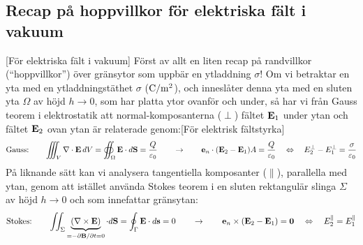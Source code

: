{{{{{\subsection{Recap p{\aa} hoppvillkor f{\"o}r elektriska f{\"a}lt i vakuum}
[F{\"o}r elektriska f{\"a}lt i vakuum]
F{\"o}rst av allt en liten recap p{\aa} randvillkor (``hoppvillkor'') {\"o}ver
gr{\"a}nsytor som uppb{\"a}r en ytladdning $\sigma$!
\noindent
Om vi betraktar en yta med en ytladdningst{\"a}thet
$\sigma$ (${\rm C}/{\rm m}^2$), och innesl{\aa}ter denna yta med en sluten
yta
$\Omega$ av h{\"o}jd $h\to0$, som har platta ytor ovanf{\"o}r och under,
s{\aa} har vi fr{\aa}n Gauss teorem i elektrostatik att normal-komposanterna
($\perp$) f{\"a}ltet ${\bf E}_1$ under ytan och f{\"a}ltet ${\bf E}_2$ ovan
ytan {\"a}r relaterade genom:[F{\"o}r elektrisk f{\"a}ltstyrka]
$$
  \hbox{Gauss:}\qquad
  \displaystyle
  \iiint_V\nabla\cdot{\bf E}\,dV=
  \oiint_{\Omega}{\bf E}\cdot d{\bf S}={{Q}\over{\varepsilon_0}}
  \qquad\to\qquad
  {\bf e}_n \cdot({\bf E}_{2}-{\bf E}_{1})A
    ={{Q}\over{\varepsilon_0}}
  \quad\Leftrightarrow\quad
  E^{\perp}_2-E^{\perp}_1={{\sigma}\over{\varepsilon_0}}
$$
\noindent
P{\aa} liknande s{\"a}tt kan vi analysera tangentiella komposanter
($\parallel$), parallella med ytan, genom att ist{\"a}llet anv{\"a}nda Stokes
teorem i en sluten rektangul{\"a}r slinga $\Sigma$ av h{\"o}jd $h\to0$ och
som innefattar gr{\"a}nsytan:
$$
  \hbox{Stokes:}\qquad
  \iint_{\Sigma}\underbrace{(\nabla\times{\bf E})}_{=-\partial{\bf B}/\partial t=0}
      \cdot d{\bf S}
    =\oint_{\Gamma}{\bf E}\cdot d{\bf s}
    =0
  \qquad\to\qquad
  {\bf e}_n \times({\bf E}_{2}-{\bf E}_{1})={\bf 0}
  \quad\Leftrightarrow\quad
  E^{\parallel}_2=E^{\parallel}_1
$$
\vfill\eject

}}}}}
